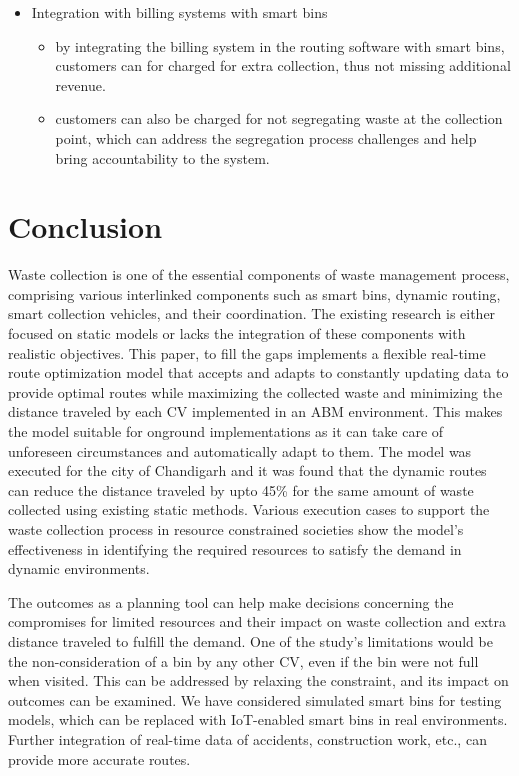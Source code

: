 \documentclass[12pt]{article}
\begin{document}
\begin{itemize}
\begin{itemize}
\begin{itemize}
 \end{itemize}
 \item Integration with billing systems with smart bins
   \begin{itemize}
 \item by integrating the billing system in the routing software with smart bins, customers can for charged for extra collection, thus not missing additional revenue. \item customers can also be charged for not segregating waste at the collection point, which can address the segregation process challenges and help bring accountability to the system.

\end{itemize}
\end{itemize}
\end{itemize}
\section{Conclusion}
Waste collection is one of the essential components of waste management process, comprising various interlinked components such as smart bins, dynamic routing, smart collection vehicles, and their coordination. The existing research is either focused on static models or lacks the integration of these components with realistic objectives. This paper, to fill the gaps implements a flexible real-time route optimization model that accepts and adapts to constantly updating data to provide optimal routes while maximizing the collected waste and minimizing the distance traveled by each CV implemented in an ABM environment. This makes the model suitable for onground implementations as it can take care of unforeseen circumstances and automatically adapt to them. The model was executed for the city of Chandigarh and it was found that the dynamic routes can reduce the distance traveled by upto 45\% for the same amount of waste collected using existing static methods. Various execution cases to support the waste collection process in resource constrained societies show the model's effectiveness in identifying the required resources to satisfy the demand in dynamic environments. 

The outcomes as a planning tool can help make decisions concerning the compromises for limited resources and their impact on waste collection and extra distance traveled to fulfill the demand. One of the study's limitations would be the non-consideration of a bin by any other CV, even if the bin were not full when visited. This can be addressed by relaxing the constraint, and its impact on outcomes can be examined. We have considered simulated smart bins for testing models, which can be replaced with IoT-enabled smart bins in real environments. Further integration of real-time data of accidents, construction work, etc., can provide more accurate routes.





\end{document}
